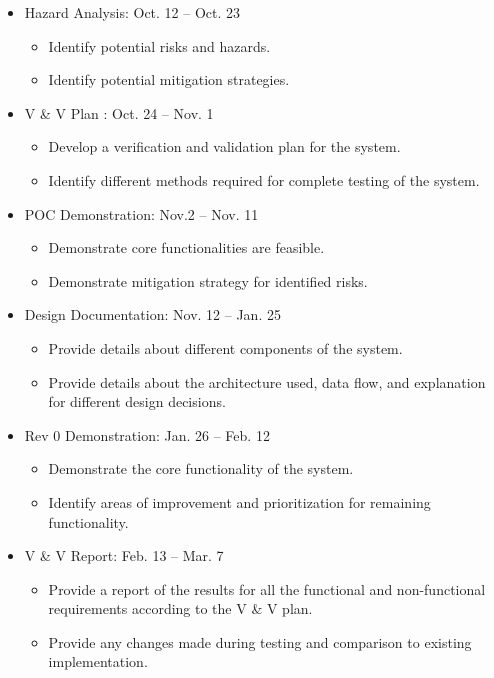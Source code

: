 \documentclass[12pt]{article}
\begin{document}
\begin{itemize}
  \item Hazard Analysis: Oct. 12 -- Oct. 23  
  \begin{itemize}
    \item Identify potential risks and hazards.
    \item Identify potential mitigation strategies.
  \end{itemize}

  \item V & V Plan : Oct. 24 -- Nov. 1  
  \begin{itemize}
    \item Develop a verification and validation plan for the system.
    \item Identify different methods required for complete testing of the system.
  \end{itemize}

  \item POC Demonstration: Nov.2  -- Nov. 11  
  \begin{itemize}
    \item Demonstrate core functionalities are feasible.
    \item Demonstrate mitigation strategy for identified risks.
  \end{itemize}

  \item Design Documentation: Nov. 12 -- Jan. 25 
  \begin{itemize}
    \item Provide details about different components of the system.
    \item Provide details about the architecture used, data flow, and explanation for different design decisions.
  \end{itemize}

  \item Rev 0 Demonstration: Jan. 26 -- Feb. 12
  \begin{itemize}
    \item Demonstrate the core functionality of the system.
    \item Identify areas of improvement and prioritization for remaining functionality.
  \end{itemize}

  \item V & V Report: Feb. 13 -- Mar. 7 
  \begin{itemize}
    \item Provide a report of the results for all the functional and non-functional requirements according to the V & V plan.
    \item Provide any changes made during testing and comparison to existing implementation.
  \end{itemize}
  

\end{itemize}
\end{document}
